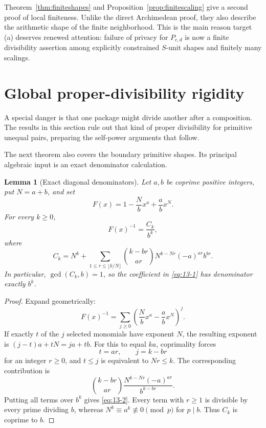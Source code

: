 \documentclass[11pt]{article}
\numberwithin{equation}{section}
\newtheorem{lemma}[theorem]{Lemma}
\theoremstyle{definition}
\begin{document}
Theorem~\ref{thm:finiteshapes} and Proposition~\ref{prop:finitescaling}
give a second proof of local finiteness.  Unlike the direct Archimedean proof,
they also describe the arithmetic shape of the finite neighborhood.  This is
the main reason target (a) deserves renewed attention: failure of privacy for
\(P_{c,d}\) is now a finite divisibility assertion among explicitly
constrained \(S\)-unit shapes and finitely many scalings.

\section{Global proper-divisibility rigidity}

A special danger is that one package might divide another after a composition.  The results in this section rule out that kind of proper divisibility for primitive unequal pairs, preparing the self-power arguments that follow.
\label{sec:nodivision}

The next theorem also covers the boundary primitive shapes.  Its principal
algebraic input is an exact denominator calculation.

\begin{lemma}[Exact diagonal denominators]\label{lem:diagonaldenominator}
Let \(a,b\) be coprime positive integers, put \(N=a+b\), and set
\[
 F(x)=1-\frac Nb x^a+\frac ab x^N.
\]
For every \(k\geq0\),
\begin{equation}
 [x^{ka}]F(x)^{-1}=\frac{C_k}{b^k},
 \label{eq:13-1}
\end{equation}
where
\begin{equation}
 C_k=N^k+
 \sum_{1\leq r\leq\lfloor k/N\rfloor}
 \binom{k-br}{ar}N^{k-Nr}(-a)^{ar}b^{br}.
 \label{eq:13-2}
\end{equation}
In particular, \(\gcd(C_k,b)=1\), so the coefficient in \eqref{eq:13-1} has
denominator exactly \(b^k\).
\end{lemma}

\begin{proof}
Expand geometrically:
\[
 F(x)^{-1}=\sum_{j\geq0}
 \left(\frac Nb x^a-\frac ab x^N\right)^j.
\]
If exactly \(t\) of the \(j\) selected monomials have exponent \(N\), the
resulting exponent is \((j-t)a+tN=ja+tb\).  For this to equal \(ka\),
coprimality forces
\[
 t=ar,\qquad j=k-br
\]
for an integer \(r\geq0\), and \(t\leq j\) is equivalent to \(Nr\leq k\).
The corresponding contribution is
\[
 \binom{k-br}{ar}\frac{N^{k-Nr}(-a)^{ar}}{b^{k-br}}.
\]
Putting all terms over \(b^k\) gives \eqref{eq:13-2}.  Every term with \(r\geq1\)
is divisible by every prime dividing \(b\), whereas
\(N^k\equiv a^k\not\equiv0\pmod p\) for \(p\mid b\).  Thus \(C_k\) is
coprime to \(b\).
\end{proof}
\end{document}
